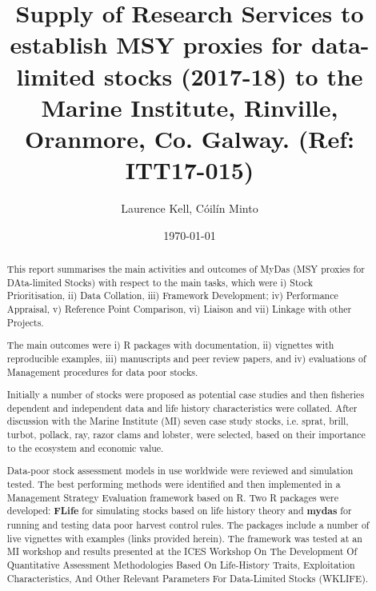 \documentclass[a4paper, 10pt]{article}
\title{Supply of Research Services to establish MSY proxies for data-limited stocks (2017-18) to the Marine Institute, Rinville, Oranmore, Co. Galway.
(Ref: ITT17-015)}
\author{Laurence Kell, C\'oil\'in Minto}
\date{\today}
\begin{document}


\onehalfspacing
{}
\rhead{}

\maketitle
\thispagestyle{fancy}
\pagestyle{empty}

%

\onehalfspacing
{}
\rhead{}

\maketitle
\thispagestyle{fancy}
\pagestyle{empty}

\maketitle

\begin{abstract}

This report summarises the main activities and outcomes of MyDas (MSY proxies for DAta-limited Stocks) with respect to the main tasks, which were i) Stock Prioritisation, ii) Data Collation, iii) Framework Development; iv) Performance Appraisal, v) Reference Point Comparison, vi) Liaison and vii) Linkage with other Projects.

The main outcomes were i) R packages with documentation, ii)  vignettes with reproducible examples, iii) manuscripts and peer review papers, and iv) evaluations of Management procedures for data poor stocks.

Initially a number of stocks were proposed as potential case studies and then fisheries dependent and independent data and life history characteristics were collated.  After discussion with the Marine Institute (MI) seven case study stocks, i.e. sprat, brill, turbot, pollack, ray, razor clams and lobster, were selected, based on their importance to the ecosystem and economic value.

Data-poor stock assessment models in use worldwide were reviewed and simulation tested. The best performing methods were identified and then implemented in a Management Strategy Evaluation framework based on R. Two R packages were developed: \textbf{FLife} for simulating stocks based on life history theory and \textbf{mydas} for running and testing data poor harvest control rules. The packages include a number of live vignettes with examples (links provided herein). The framework was tested at an MI workshop and results presented at the ICES Workshop On The Development Of Quantitative Assessment Methodologies Based On Life-History Traits, Exploitation Characteristics, And Other Relevant Parameters For Data-Limited Stocks (WKLIFE).

\end{abstract}
\end{document}
